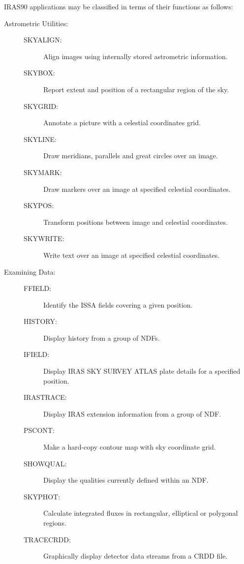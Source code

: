 {\small IRAS90} applications may be classified in terms of their
functions as follows:
\begin{description}

\item [Astrometric Utilities:]
\mbox{}
\begin{description}
\item[SKYALIGN: ] Align images using internally stored astrometric
information.
\item[SKYBOX:   ] Report extent and position of a rectangular region of the
sky.
\item[SKYGRID:  ] Annotate a picture with a celestial coordinates grid.
\item[SKYLINE:  ] Draw meridians, parallels and great circles over an
image.
\item[SKYMARK:  ] Draw markers over an image at specified celestial
coordinates.
\item[SKYPOS:   ] Transform positions between image and celestial
coordinates.
\item[SKYWRITE: ] Write text over an image at specified celestial
coordinates.
\end{description}

\item [Examining Data:]
\mbox{}
\begin{description}
\item[FFIELD:   ] Identify the ISSA fields covering a given position.
\item[HISTORY:  ] Display history from a group of NDFs.
\item[IFIELD:   ] Display IRAS SKY SURVEY ATLAS plate details for a
specified position.
\item[IRASTRACE:] Display IRAS extension information from a group of NDF.
\item[PSCONT:   ] Make a hard-copy contour map with sky coordinate grid.
\item[SHOWQUAL: ] Display the qualities currently defined within an NDF.
\item[SKYPHOT:  ] Calculate integrated fluxes in rectangular, elliptical or
polygonal regions.
\item[TRACECRDD: ] Graphically display detector data streams from a CRDD
file.
\end{description}


\end{description}
